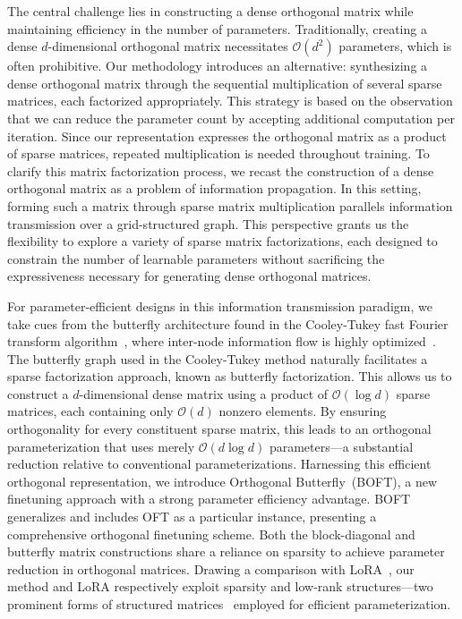 The central challenge lies in constructing a dense orthogonal matrix while maintaining efficiency in the number of parameters. Traditionally, creating a dense $d$-dimensional orthogonal matrix necessitates $\mathcal{O}(d^2)$ parameters, which is often prohibitive. Our methodology introduces an alternative: synthesizing a dense orthogonal matrix through the sequential multiplication of several sparse matrices, each factorized appropriately. This strategy is based on the observation that we can reduce the parameter count by accepting additional computation per iteration. Since our representation expresses the orthogonal matrix as a product of sparse matrices, repeated multiplication is needed throughout training. To clarify this matrix factorization process, we recast the construction of a dense orthogonal matrix as a problem of information propagation. In this setting, forming such a matrix through sparse matrix multiplication parallels information transmission over a grid-structured graph. This perspective grants us the flexibility to explore a variety of sparse matrix factorizations, each designed to constrain the number of learnable parameters without sacrificing the expressiveness necessary for generating dense orthogonal matrices.

For parameter-efficient designs in this information transmission paradigm, we take cues from the butterfly architecture found in the Cooley-Tukey fast Fourier transform algorithm~\cite{cooley1965algorithm}, where inter-node information flow is highly optimized~\cite{klasing1994broadcasting}. The butterfly graph used in the Cooley-Tukey method naturally facilitates a sparse factorization approach, known as butterfly factorization. This allows us to construct a $d$-dimensional dense matrix using a product of $\mathcal{O}(\log d)$ sparse matrices, each containing only $\mathcal{O}(d)$ nonzero elements. By ensuring orthogonality for every constituent sparse matrix, this leads to an orthogonal parameterization that uses merely $\mathcal{O}(d\log d)$ parameters—a substantial reduction relative to conventional parameterizations. Harnessing this efficient orthogonal representation, we introduce Orthogonal Butterfly~(BOFT), a new finetuning approach with a strong parameter efficiency advantage. BOFT generalizes and includes OFT as a particular instance, presenting a comprehensive orthogonal finetuning scheme. Both the block-diagonal and butterfly matrix constructions share a reliance on sparsity to achieve parameter reduction in orthogonal matrices. Drawing a comparison with LoRA~\cite{hulora2022}, our method and LoRA respectively exploit sparsity and low-rank structures—two prominent forms of structured matrices~\cite{candes2011robust} employed for efficient parameterization.

